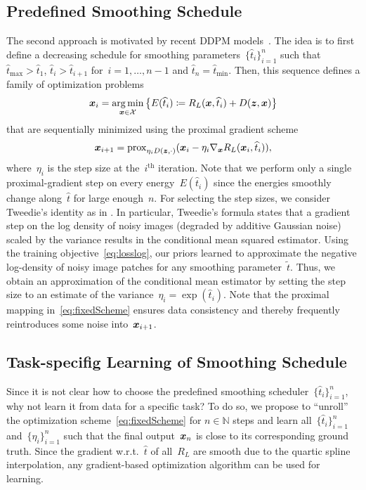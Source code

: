 \documentclass[nohyperref]{article}
\newcommand{\N}{\mathbb{N}}
\newcommand{\X}{\mathcal{X}}
\newcommand{\prox}{\mathrm{prox}}
\def\hatt{{\widehat{t}}}
\newcommand{\tminh}{\hatt_\mathrm{min}}
\newcommand{\tmaxh}{\hatt_\mathrm{max}}
\theoremstyle{plain}
\theoremstyle{definition}
\theoremstyle{remark}
\begin{document}
\subsection{Predefined Smoothing Schedule} \label{sec:predefinedSchedule}
The second approach is motivated by recent DDPM models~\citep{SoEr19,HoJa20}.
The idea is to first define a decreasing schedule for smoothing parameters~$\{\widehat{t}_i\}_{i=1}^n$ such that~$\tmaxh>\widehat{t}_1$, $\widehat{t}_i>\widehat{t}_{i+1}$ for~$i=1,\ldots,n-1$ and $\widehat{t}_n=\tminh$.
Then, this sequence defines a family of optimization problems
\[
\vx_i =\argmin_{\vx\in\X} \left\{E(\widehat{t}_i)\coloneqq R_L(\vx,\widehat{t}_i)+D(\vz,\vx)\right\}
\]
that are sequentially minimized using the proximal gradient scheme~\citep{Be17}
\begin{align} \label{eq:fixedScheme}
\vx_{i+1} = \prox_{\eta_iD(\vz,\cdot)}(\vx_i-\eta_i\nabla_\vx R_L(\vx_i,\widehat{t}_i)),
\end{align}
where~$\eta_i$ is the step size at the~$i^\text{th}$ iteration.
Note that we perform only a single proximal-gradient step on every energy~$E(\widehat{t}_i)$ since the energies smoothly change along~$\widehat{t}$ for large enough~$n$.
For selecting the step sizes, we consider Tweedie's identity as in .
In particular, Tweedie's formula states that a gradient step on the log density of noisy images (degraded by additive Gaussian noise) scaled by the variance results in the conditional mean squared estimator.
Using the training objective~\eqref{eq:losslog}, our priors learned to approximate the negative log-density of noisy image patches for any smoothing parameter~$\widetilde{t}$.
Thus, we obtain an approximation of the conditional mean estimator by setting the step size to an estimate of the variance~$\eta_i=\exp(\widehat{t}_i)$.
Note that the proximal mapping in~\eqref{eq:fixedScheme} ensures data consistency and thereby frequently reintroduces some noise into~${\bm{x}}_{i+1}$.

\subsection{Task-specifig Learning of Smoothing Schedule} \label{sec:learnedVN}
Since it is not clear how to choose the predefined smoothing scheduler~$\{\widehat{t}_i\}_{i=1}^n$, why not learn it from data for a specific task?
To do so, we propose to ``unroll'' the optimization scheme~\eqref{eq:fixedScheme} for $n\in\N$ steps and learn all~$\{\hatt_i\}_{i=1}^n$ and~$\{\eta_i\}_{i=1}^n$ such that the final output~${\bm{x}}_n$ is close to its corresponding ground truth.
Since the gradient w.r.t.~$\hatt$ of all~$R_L$ are smooth due to the quartic spline interpolation, any gradient-based optimization algorithm can be used for learning.
\end{document}
